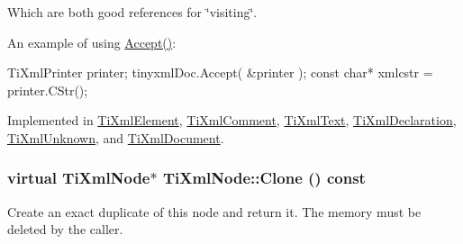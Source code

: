 Which are both good references for \char`\"{}visiting\char`\"{}.

An example of using \hyperlink{class_ti_xml_node_acc0f88b7462c6cb73809d410a4f5bb86}{Accept()}: \begin{DoxyVerb}
		TiXmlPrinter printer;
		tinyxmlDoc.Accept( &printer );
		const char* xmlcstr = printer.CStr();
		\end{DoxyVerb}
 

Implemented in \hyperlink{class_ti_xml_element_a71a81b2afb0d42be1543d1c404dee6f5}{TiXmlElement}, \hyperlink{class_ti_xml_comment_af3ac1b99fbbe9ea4fb6e14146156e43e}{TiXmlComment}, \hyperlink{class_ti_xml_text_a8483d4415ce9de6c4fa8f63d067d5de6}{TiXmlText}, \hyperlink{class_ti_xml_declaration_a22315a535983b86535cdba3458669e3e}{TiXmlDeclaration}, \hyperlink{class_ti_xml_unknown_ad7122e5135581b3c832a1a3217760a93}{TiXmlUnknown}, and \hyperlink{class_ti_xml_document_aa545aae325d9752ad64120bc4ecf939a}{TiXmlDocument}.\hypertarget{class_ti_xml_node_a4508cc3a2d7a98e96a54cc09c37a78a4}{
\subsubsection[{Clone}]{\setlength{\rightskip}{0pt plus 5cm}virtual {\bf TiXmlNode}$\ast$ TiXmlNode::Clone () const}}
\label{class_ti_xml_node_a4508cc3a2d7a98e96a54cc09c37a78a4}
Create an exact duplicate of this node and return it. The memory must be deleted by the caller. 

